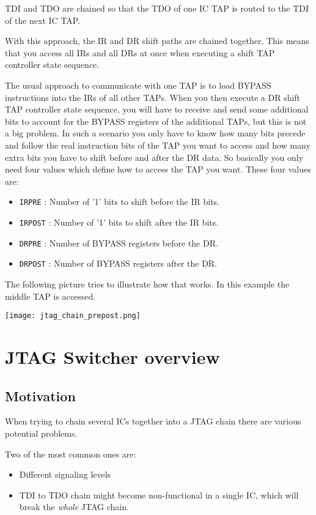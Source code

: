\documentclass[10pt,english,a4paper]{report}
\begin{document}
TDI and TDO are chained so that the TDO of one IC TAP is routed to the TDI of the next IC TAP.

With this approach, the IR and DR shift paths are chained together.
This means that you access all IRs and all DRs at once when executing a shift TAP controller state sequence.

The usual approach to communicate with one TAP is to load BYPASS
instructions into the IRs of all other TAPs. When you then execute a DR shift
TAP controller state sequence, you will have to receive and send some additional
bits to account for the BYPASS registers of the additional TAPs, but this is not
a big problem. In such a scenario you only have to know how many bits precede
and follow the real instruction bits of the TAP you want to access and how many
extra bits you have to shift before and after the DR data. So basically you only
need four values which define how to access the TAP you want. These four values
are:
\begin{itemize}
\item {\tt IRPRE} : Number of '1' bits to shift before the IR bits.
\item {\tt IRPOST} : Number of '1' bits to shift after the IR bits.
\item {\tt DRPRE} : Number of BYPASS registers before the DR.
\item {\tt DRPOST} : Number of BYPASS registers after the DR.
\end{itemize}

The following picture tries to illustrate how that works. In this example the middle TAP is accessed.
\begin{center}
	\texttt{[image: jtag\_chain\_prepost.png]}
\end{center}

\chapter{JTAG Switcher overview}
\section{Motivation}
When trying to chain several ICs together into a JTAG chain there are various potential problems.

Two of the most common ones are:
\begin{itemize}
\item Different signaling levels
\item TDI to TDO chain might become non-functional in a single IC, which will break the {\em whole} JTAG chain.
\end{itemize}
\end{document}
